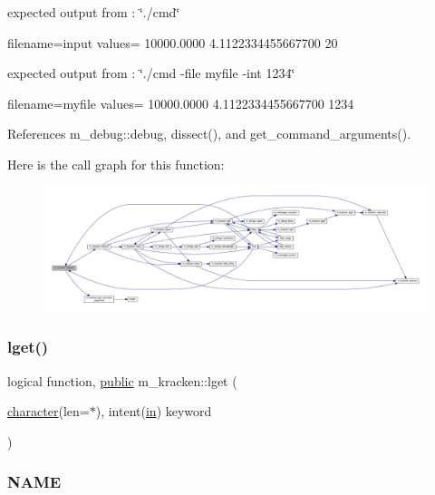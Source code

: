 expected output from \+: \char`\"{}./cmd\char`\"{} \begin{DoxyVerb}   filename=input
   values= 10000.0000  4.1122334455667700  20
\end{DoxyVerb}


expected output from \+: \char`\"{}./cmd -\/file myfile -\/int 1234\char`\"{} \begin{DoxyVerb}   filename=myfile
   values= 10000.0000  4.1122334455667700  1234 \end{DoxyVerb}
 

References m\+\_\+debug\+::debug, dissect(), and get\+\_\+command\+\_\+arguments().

Here is the call graph for this function\+:
\nopagebreak
\begin{figure}[H]
\begin{center}
\leavevmode
\includegraphics[width=350pt]{namespacem__kracken_a850dce381e1cfe18a4ebcaa214995e39_cgraph}
\end{center}
\end{figure}
\mbox{\label{namespacem__kracken_a7141acd7a00c1a5aa5f90612a0414b63}} 
\subsubsection{\texorpdfstring{lget()}{lget()}}
{\footnotesize\ttfamily logical function, \hyperlink{M__stopwatch_83_8txt_a2f74811300c361e53b430611a7d1769f}{public} m\+\_\+kracken\+::lget (\begin{DoxyParamCaption}\item[{\hyperlink{option__stopwatch_83_8txt_abd4b21fbbd175834027b5224bfe97e66}{character}(len=$\ast$), intent(\hyperlink{M__journal_83_8txt_afce72651d1eed785a2132bee863b2f38}{in})}]{keyword }\end{DoxyParamCaption})}



\subsubsection*{N\+A\+ME}

